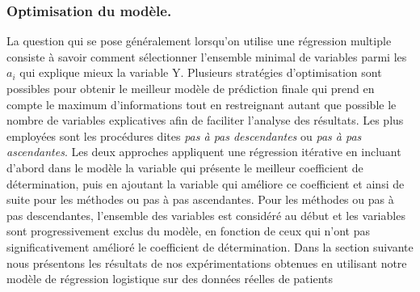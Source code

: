 \subsubsection{Optimisation du modèle.}La question qui se pose généralement lorsqu’on utilise une régression multiple consiste à savoir comment sélectionner l’ensemble minimal de variables parmi les \emph{$a_i$} qui explique mieux la variable \textsc{Y}. Plusieurs stratégies d’optimisation sont possibles pour obtenir le meilleur modèle de prédiction finale qui prend en compte le maximum d'informations tout en restreignant autant que possible le nombre de variables explicatives afin de faciliter l'analyse des résultats. Les plus employées sont les  procédures dites \emph{pas à pas descendantes} ou \emph{pas à pas ascendantes}. Les deux approches appliquent une régression itérative en incluant d’abord dans le modèle la variable qui présente le meilleur coefficient de détermination, puis en ajoutant la variable qui améliore ce coefficient et ainsi de suite pour les méthodes ou pas à pas ascendantes. Pour les méthodes ou pas à pas descendantes, l’ensemble des variables est considéré au début et les variables sont progressivement exclus du modèle, en fonction de ceux qui n’ont pas significativement amélioré le coefficient de détermination.
Dans la section suivante nous présentons les résultats de nos expérimentations obtenues en utilisant notre modèle de régression logistique sur des données réelles de patients









